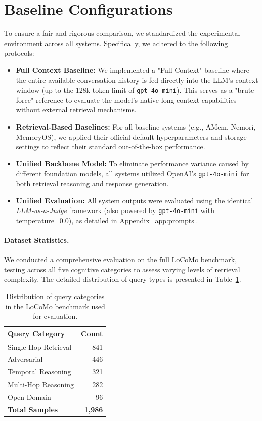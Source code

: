 \documentclass[11pt]{article}
\begin{document}
\section{Baseline Configurations}
\label{app:baselines}

To ensure a fair and rigorous comparison, we standardized the experimental environment across all systems. Specifically, we adhered to the following protocols:

\begin{itemize}
    \item \textbf{Full Context Baseline:} We implemented a "Full Context" baseline where the entire available conversation history is fed directly into the LLM's context window (up to the 128k token limit of \texttt{gpt-4o-mini}). This serves as a "brute-force" reference to evaluate the model's native long-context capabilities without external retrieval mechanisms.
    \item \textbf{Retrieval-Based Baselines:} For all baseline systems (e.g., AMem, Nemori, MemoryOS), we applied their official default hyperparameters and storage settings to reflect their standard out-of-the-box performance.
    \item \textbf{Unified Backbone Model:} To eliminate performance variance caused by different foundation models, all systems utilized OpenAI's \texttt{gpt-4o-mini} for both retrieval reasoning and response generation.
    \item \textbf{Unified Evaluation:} All system outputs were evaluated using the identical \textit{LLM-as-a-Judge} framework (also powered by \texttt{gpt-4o-mini} with temperature=0.0), as detailed in Appendix~\ref{app:prompts}.
\end{itemize}

\paragraph{Dataset Statistics.}
We conducted a comprehensive evaluation on the full LoCoMo benchmark, testing across all five cognitive categories to assess varying levels of retrieval complexity. The detailed distribution of query types is presented in Table~\ref{tab:locomo_stats}.

\begin{table}[h]
\centering
\small
\caption{Distribution of query categories in the LoCoMo benchmark used for evaluation.}
\label{tab:locomo_stats}
\begin{tabular}{l r}
\toprule
\textbf{Query Category} & \textbf{Count} \\
\midrule
Single-Hop Retrieval & 841 \\
Adversarial & 446 \\
Temporal Reasoning & 321 \\
Multi-Hop Reasoning & 282 \\
Open Domain & 96 \\
\midrule
\textbf{Total Samples} & \textbf{1,986} \\
\bottomrule
\end{tabular}
\end{table}
\end{document}
